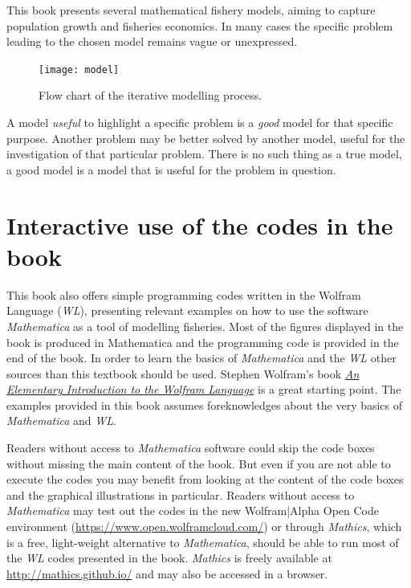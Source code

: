 \documentclass[11pt,fleqn]{book} %
\begin{document}
This book presents several mathematical fishery models, aiming to capture population growth and fisheries economics. In many cases the specific problem leading to the chosen model remains vague or unexpressed. 

\begin{figure}[ht]
\centering\texttt{[image: model]} 
\caption{Flow chart of the iterative modelling process.}
\label{fig:model}
\end{figure}

\begin{definition}
A model \textit{useful} to highlight a specific problem is a \textit{good} model for that specific purpose. Another problem may be better solved by another model, useful for the investigation of that particular problem. There is no such thing as a true model, a good model is a model that is useful for the problem in question.
\end{definition}

\section{Interactive use of the codes in the book}
This book also offers simple programming codes written in the Wolfram Language (\textit{WL}), presenting relevant examples on how to use the software \textit{Mathematica} as a tool of modelling fisheries. Most of the figures displayed in the book is produced in Mathematica and the programming code is provided in the end of the book. In order to learn the basics of \textit{Mathematica} and the \textit{WL} other sources than this textbook should be used. Stephen Wolfram's book \href{https://www.wolfram.com/language/elementary-introduction/2nd-ed/}{\textit{An Elementary Introduction to the Wolfram Language}} is a great starting point. The examples provided in this book assumes foreknowledges about the very basics of \textit{Mathematica} and \textit{WL}.

Readers without access to \textit{Mathematica} software could skip the code boxes without missing the main content of the book. But even if you are not able to execute the codes you may benefit from looking at the content of the code boxes and the graphical illustrations in particular. Readers without access to \textit{Mathematica} may test out the codes in the new Wolfram|Alpha Open Code environment (\url{https://www.open.wolframcloud.com/}) or through \textit{Mathics}, which is a free, light-weight alternative to \textit{Mathematica}, should be able to run most of the \textit{WL} codes presented in the book. \textit{Mathics} is freely available at \url{http://mathics.github.io/} and may also be accessed in a browser.
\end{document}
